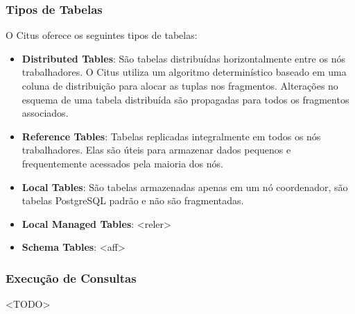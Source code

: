 \subsubsection{Tipos de Tabelas}
O Citus oferece os seguintes tipos de tabelas:
\begin{itemize}
	\item \textbf{Distributed Tables}: 
	São tabelas distribuídas horizontalmente entre os nós trabalhadores. 
	O Citus utiliza um algoritmo determinístico baseado em uma coluna de distribuição para alocar as tuplas nos fragmentos.
	Alterações no esquema de uma tabela distribuída são propagadas para todos os fragmentos associados.

	\item \textbf{Reference Tables}: 
	Tabelas replicadas integralmente em todos os nós trabalhadores. 
	Elas são úteis para armazenar dados pequenos e frequentemente acessados pela maioria dos nós.

	\item \textbf{Local Tables}: 
	São tabelas armazenadas apenas em um nó coordenador, são tabelas PostgreSQL padrão e não são fragmentadas.
	
	\item \textbf{Local Managed Tables}: 
	<reler>

	\item \textbf{Schema Tables}: 
	<aff>

\end{itemize}

\subsubsection{Execução de Consultas}
<TODO>